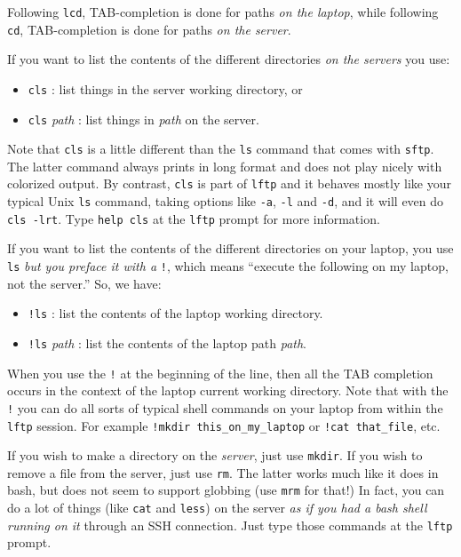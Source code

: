 \documentclass[]{krantz}
\providecommand{\tightlist}{%
  \setlength{\itemsep}{0pt}\setlength{\parskip}{0pt}}
\begin{document}
Following \texttt{lcd}, TAB-completion is done for paths \emph{on the laptop}, while following
\texttt{cd}, TAB-completion is done for paths \emph{on the server}.

If you want to list the contents of the different directories \emph{on the servers} you use:

\begin{itemize}
\tightlist
\item
  \texttt{cls} : list things in the server working directory, or
\item
  \texttt{cls} \emph{path} : list things in \emph{path} on the server.
\end{itemize}

Note that \texttt{cls} is a little different than the \texttt{ls} command that comes
with \texttt{sftp}. The latter command always prints in long format and does not play
nicely with colorized output. By contrast, \texttt{cls} is part of \texttt{lftp} and it
behaves mostly like your typical Unix \texttt{ls} command, taking options like \texttt{-a}, \texttt{-l} and \texttt{-d}, and
it will even do \texttt{cls\ -lrt}. Type \texttt{help\ cls} at the \texttt{lftp} prompt for more information.

If you want to list the contents of the different directories on your laptop, you
use \texttt{ls} \emph{but you preface it with a} \texttt{!}, which means ``execute the following on my
laptop, not the server.'' So, we have:

\begin{itemize}
\tightlist
\item
  \texttt{!ls} : list the contents of the laptop working directory.
\item
  \texttt{!ls} \emph{path} : list the contents of the laptop path \emph{path}.
\end{itemize}

When you use the \texttt{!} at the beginning of the line, then all the TAB completion occurs
in the context of the laptop current working directory. Note that with the \texttt{!}
you can do all sorts of typical shell commands on your laptop from within the \texttt{lftp}
session. For example \texttt{!mkdir\ this\_on\_my\_laptop} or \texttt{!cat\ that\_file}, etc.

If you wish to make a directory on the \emph{server}, just use \texttt{mkdir}. If you wish to
remove a file from the server, just use \texttt{rm}. The latter works much like it does in
bash, but does not seem to support globbing (use \texttt{mrm} for that!) In fact, you can
do a lot of things (like \texttt{cat} and \texttt{less}) on the server
\emph{as if you had a bash shell running on it} through an
SSH connection. Just type those commands at the \texttt{lftp} prompt.
\end{document}
